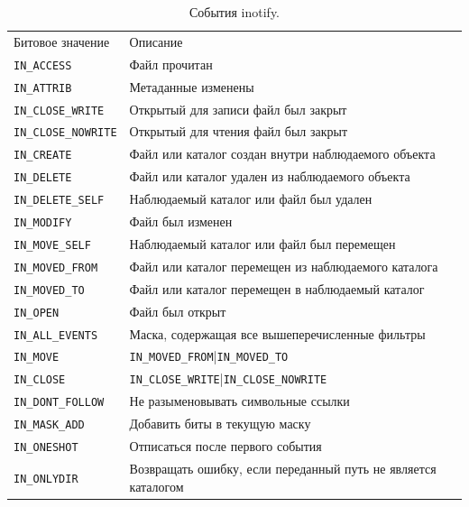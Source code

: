 \documentclass[14pt, russian]{scrartcl}
\newcommand{\code}[1]{\texttt{#1}}
\begin{document}
\begin{table}[htb]
  \caption{\centering События inotify.}
  \small
  \centering\begin{tabular}{|l|l|}
              \hline\hline
              \multirow{ 2}{*}{Битовое значение} & \multirow{ 2}{*}{Описание}\\
                                                 & \\
              \hline
              \code{IN\_ACCESS} & Файл прочитан\\
              \hline
              \code{IN\_ATTRIB} & Метаданные изменены\\
              \hline
              \code{IN\_CLOSE\_WRITE} & Открытый для записи файл был закрыт \\
              \hline
              \code{IN\_CLOSE\_NOWRITE} & Открытый для чтения файл был закрыт \\
              \hline
              \code{IN\_CREATE} & Файл или каталог создан внутри наблюдаемого объекта \\
              \hline
              \code{IN\_DELETE} & Файл или каталог удален из наблюдаемого объекта \\
              \hline
              \code{IN\_DELETE\_SELF} & Наблюдаемый каталог или файл был удален \\
              \hline
              \code{IN\_MODIFY} & Файл был изменен \\
              \hline
              \code{IN\_MOVE\_SELF} & Наблюдаемый каталог или файл был перемещен \\
              \hline
              \code{IN\_MOVED\_FROM} & Файл или каталог перемещен из наблюдаемого каталога \\
              \hline
              \code{IN\_MOVED\_TO} & Файл или каталог перемещен в наблюдаемый каталог \\
              \hline
              \code{IN\_OPEN} & Файл был открыт \\
              \hline
              \code{IN\_ALL\_EVENTS} & Маска, содержащая все вышеперечисленные фильтры \\
              \hline
              \code{IN\_MOVE} & \code{IN\_MOVED\_FROM}|\code{IN\_MOVED\_TO} \\
              \hline
              \code{IN\_CLOSE} & \code{IN\_CLOSE\_WRITE}|\code{IN\_CLOSE\_NOWRITE} \\
              \hline
              \code{IN\_DONT\_FOLLOW} & Не разыменовывать символьные ссылки \\
              \hline
              \code{IN\_MASK\_ADD} & Добавить биты в текущую маску \\
              \hline
              \code{IN\_ONESHOT} & Отписаться после первого события \\
              \hline
              \code{IN\_ONLYDIR} & Возвращать ошибку, если переданный путь не является каталогом \\
              \hline\hline
            \end{tabular}
            \label{table:mask-in}
\end{table}
\end{document}
